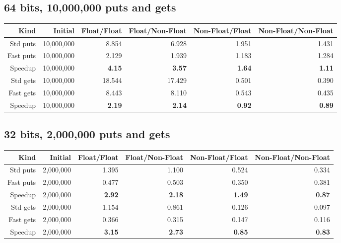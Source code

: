 \documentclass{article}
\begin{document}
\subsection*{64 bits, 10,000,000 puts and gets}

\begin{tabular}{|r|r|r|r|r|r|} \hline
Kind & Initial & Float/Float & Float/Non-Float & Non-Float/Float & Non-Float/Non-Float \\ \hline
Std puts  & 10,000,000 & 8.854& 6.928 &1.951 & 1.431 \\ \hline
Fast puts & 10,000,000 & 2.129 & 1.939 &  1.183 & 1.284 \\ \hline
Speedup & 10,000,000 &\bf 4.15 &\bf 3.57 &\bf 1.64 &\bf 1.11 \\ \hline
Std gets & 10,000,000 &  18.544 & 17.429 & 0.501 & 0.390  \\ \hline
Fast gets & 10,000,000 & 8.443 & 8.110 & 0.543 & 0.435  \\ \hline
Speedup & 10,000,000 &\bf 2.19 &\bf 2.14 &\bf 0.92  &\bf 0.89  \\ \hline
\end{tabular}

\subsection*{32 bits, 2,000,000 puts and gets}

\begin{tabular}{|r|r|r|r|r|r|} \hline
Kind & Initial & Float/Float & Float/Non-Float & Non-Float/Float & Non-Float/Non-Float \\ \hline
Std puts  & 2,000,000 & 1.395 & 1.100 & 0.524 & 0.334 \\ \hline
Fast puts & 2,000,000 & 0.477 & 0.503 & 0.350 & 0.381 \\ \hline
Speedup   & 2,000,000 &\bf 2.92  &\bf 2.18  &\bf 1.49  &\bf 0.87 \\ \hline
Std gets  & 2,000,000 & 1.154 & 0.861 & 0.126 & 0.097 \\ \hline
Fast gets & 2,000,000 & 0.366 & 0.315 & 0.147 & 0.116 \\ \hline
Speedup   & 2,000,000 & \bf 3.15 &\bf 2.73 &\bf 0.85 &\bf 0.83 \\ \hline
\end{tabular}
\end{document}
